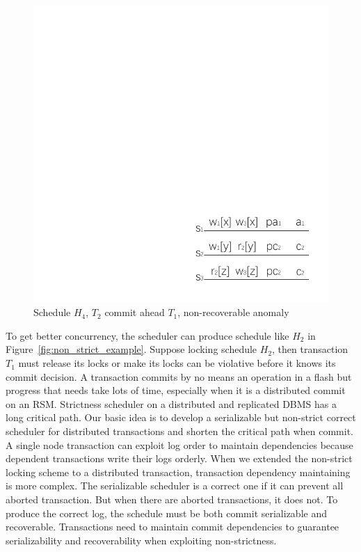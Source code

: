 \documentclass[conference]{IEEEtran}
\begin{document}
\begin{figure}[htbp]
  \centerline{\includegraphics[scale=1]{figure/schedule_not_recoverable.pdf}}
  \caption{Schedule ${H_4}$, ${T_2}$ commit ahead ${T_1}$, non-recoverable anomaly}
  \label{fig:schedule_not_recoverable}
\end{figure}


To get better concurrency, the scheduler can produce schedule like ${H_2}$ in Figure~\ref{fig:non_strict_example}. 
Suppose locking schedule ${H_2}$, then transaction ${T_1}$ must release its locks or make its locks can be violative before it knows its commit decision.
A transaction commits by no means an operation in a flash but progress that needs take lots of time, especially when it is a distributed commit on an RSM.
Strictness scheduler on a distributed and replicated DBMS has a long critical path.
Our basic idea is to develop a serializable but non-strict correct scheduler for distributed transactions and shorten the critical path when commit.
A single node transaction can exploit log order to maintain dependencies because dependent transactions write their logs orderly\cite{ELR:dewitt_implementation_1984}\cite{EfficientLocking:conf/vldb/KimuraGK12}.
When we extended the non-strict locking scheme to a distributed transaction, transaction dependency maintaining is more complex.
The serializable scheduler is a correct one if it can prevent all aborted transaction.
But when there are aborted transactions, it does not.
To produce the correct log, the schedule must be both commit serializable and recoverable\cite{UnifyCR:journals/is/AlonsoVABASW94}.
Transactions need to maintain commit dependencies to guarantee serializability and recoverability when exploiting non-strictness.
\end{document}
